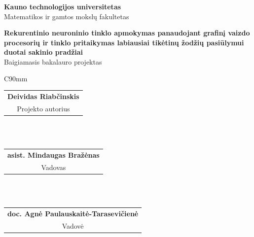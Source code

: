 

\begin{titlepage}
  \begin{center}


    \begin{figure}[H]
      \centering
    \end{figure}

    \vspace*{30pt}

    \fontXII
    \textbf{Kauno technologijos universitetas}\\
    Matematikos ir gamtos mokslų fakultetas

    \vspace*{100pt}

    \fontXVIII
	   \textbf{Rekurentinio neuroninio tinklo apmokymas panaudojant grafinį vaizdo procesorių ir tinklo pritaikymas labiausiai tikėtinų žodžių pasiūlymui duotai sakinio pradžiai}\\
     \fontXIV
     Baigiamasis bakalauro projektas

     \vspace*{76.8pt}

     \fontXII

     \singlespacing
     \begin{table}[H]
       \centering
      \begin{tabular}{C{90mm}}
      \hline
       \\
      \begin{tabular}{@{}c@{}}\textbf{Deividas Riabčinskis}\\Projekto autorius\end{tabular} \\
       \\
      \begin{tabular}{@{}c@{}}\textbf{asist. Mindaugas Bražėnas}\\Vadovas\end{tabular} \\
       \\
        \begin{tabular}{@{}c@{}}\textbf{doc. Agnė Paulauskaitė-Tarasevičienė}\\Vadovė\end{tabular} \\
       \\ \hline
      \end{tabular}
    \end{table}


\end{center}
\end{titlepage}
